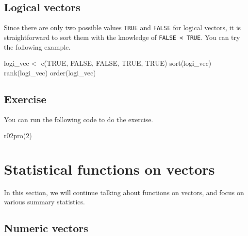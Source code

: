 \documentclass[
]{book}
\newenvironment{Shaded}{\begin{snugshade}}{\end{snugshade}}
\newcommand{\ConstantTok}[1]{\textcolor[rgb]{0.00,0.00,0.00}{#1}}
\newcommand{\DecValTok}[1]{\textcolor[rgb]{0.00,0.00,0.81}{#1}}
\newcommand{\FunctionTok}[1]{\textcolor[rgb]{0.00,0.00,0.00}{#1}}
\newcommand{\NormalTok}[1]{#1}
\newcommand{\OtherTok}[1]{\textcolor[rgb]{0.56,0.35,0.01}{#1}}
\begin{document}
\hypertarget{logical-vectors}{%
\subsection{Logical vectors}\label{logical-vectors}}

Since there are only two possible values \texttt{TRUE} and \texttt{FALSE} for logical vectors, it is straightforward to sort them with the knowledge of \texttt{FALSE\ \textless{}\ TRUE}. You can try the following example.

\begin{Shaded}
\begin{Highlighting}[]
\NormalTok{logi\_vec }\OtherTok{\textless{}{-}} \FunctionTok{c}\NormalTok{(}\ConstantTok{TRUE}\NormalTok{, }\ConstantTok{FALSE}\NormalTok{, }\ConstantTok{FALSE}\NormalTok{, }\ConstantTok{TRUE}\NormalTok{, }\ConstantTok{TRUE}\NormalTok{)}
\FunctionTok{sort}\NormalTok{(logi\_vec)}
\FunctionTok{rank}\NormalTok{(logi\_vec)}
\FunctionTok{order}\NormalTok{(logi\_vec)}
\end{Highlighting}
\end{Shaded}

\hypertarget{exercise-4}{%
\subsection{Exercise}\label{exercise-4}}

You can run the following code to do the exercise.

\begin{Shaded}
\begin{Highlighting}[]
\FunctionTok{r02pro}\NormalTok{(}\DecValTok{2}\NormalTok{)}
\end{Highlighting}
\end{Shaded}

\hypertarget{statistical-functions-on-vectors}{%
\section{Statistical functions on vectors}\label{statistical-functions-on-vectors}}

In this section, we will continue talking about functions on vectors, and focus on various summary statistics.

\hypertarget{numeric-vectors-1}{%
\subsection{Numeric vectors}\label{numeric-vectors-1}}
\end{document}
